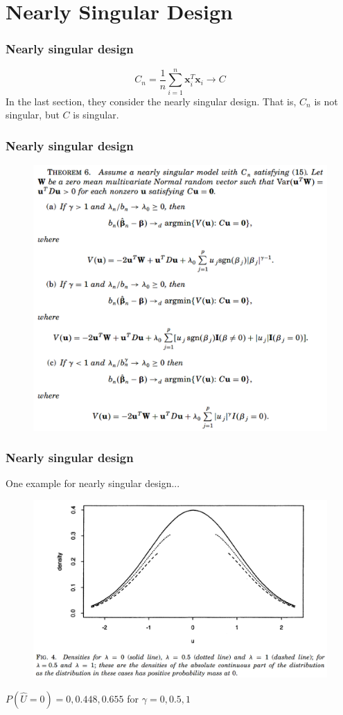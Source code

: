 \documentclass{beamer}
\begin{document}
	\section{Nearly Singular Design}
	
	\begin{frame}
		\frametitle{Nearly singular design}
		$$C_n = \frac{1}{n}\sum_{i=1}^{n}\bm{x}_i^T\bm{x}_i \to C$$
		In the last section, they consider the nearly singular design. That is, $C_n$ is not singular, but $C$ is singular.
	\end{frame}
	
	
	\begin{frame}
		\frametitle{Nearly singular design}
		\begin{figure}
			\includegraphics[width=.7\linewidth]{image015.png}
		\end{figure}
	\end{frame}
	
	\begin{frame}
		\frametitle{Nearly singular design}
		One example for nearly singular design...
		\begin{figure}
			\includegraphics[width=.8\linewidth]{image016.png}
		\end{figure}
		$P(\hat{U} = 0) = 0, 0.448, 0.655$ for $\gamma = 0, 0.5, 1$
	\end{frame}
	
	
	
	
\end{document}

